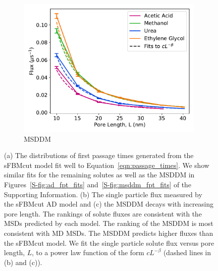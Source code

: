 \documentclass[12pt]{article}
\begin{document}
\begin{figure}
\begin{subfigure}{0.325\textwidth}
  \end{subfigure}
  \begin{subfigure}{0.325\textwidth}
  \includegraphics[width=\textwidth]{flux_curves_msddm.pdf}
  \caption{MSDDM}\label{fig:flux_curves_msddm}
  \end{subfigure}  
  \caption{(a) The distributions of first passage times generated from the sFBMcut model
  fit well to Equation~\ref{eqn:passage_times}. We show similar fits for the remaining
  solutes as well as the MSDDM in Figures~\ref{S-fig:ad_fpt_fits} and~\ref{S-fig:msddm_fpt_fits}
  of the Supporting Information. (b) The single particle flux measured 
  by the sFBMcut AD model and (c) the MSDDM decays with increasing pore length. 
  The rankings of solute fluxes are consistent with the MSDs predicted by each model.
  The ranking of the MSDDM is most consistent with MD MSDs. The MSDDM predicts higher
  fluxes than the sFBMcut model. We fit the single particle solute flux versus pore
  length, $L$, to a power law function of the form $cL^{-\beta}$ (dashed lines in (b)
  and (c)). 
  }\label{fig:flux_curves}
  \end{figure}
  
\end{document}
